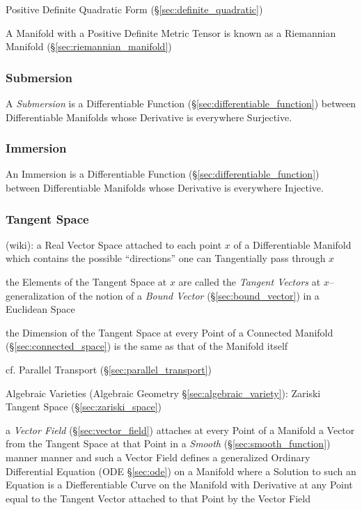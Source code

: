 Positive Definite Quadratic Form (\S\ref{sec:definite_quadratic})

A Manifold with a Positive Definite Metric Tensor is known as a
Riemannian Manifold (\S\ref{sec:riemannian_manifold})



\subsubsection{Submersion}\label{sec:submersion}

A \emph{Submersion} is a Differentiable Function
(\S\ref{sec:differentiable_function}) between Differentiable Manifolds
whose Derivative is everywhere Surjective.



\subsubsection{Immersion}\label{sec:immersion}

An Immersion is a Differentiable Function
(\S\ref{sec:differentiable_function}) between Differentiable Manifolds
whose Derivative is everywhere Injective.



\subsubsection{Tangent Space}\label{sec:tangent_space}

(wiki): a Real Vector Space attached to each point $x$ of a Differentiable
Manifold which contains the possible ``directions'' one can Tangentially pass
through $x$

the Elements of the Tangent Space at $x$ are called the \emph{Tangent Vectors}
at $x$-- generalization of the notion of a \emph{Bound Vector}
(\S\ref{sec:bound_vector}) in a Euclidean Space

the Dimension of the Tangent Space at every Point of a Connected Manifold
(\S\ref{sec:connected_space}) is the same as that of the Manifold itself

\fist cf. Parallel Transport (\S\ref{sec:parallel_transport})

\fist Algebraic Varieties (Algebraic Geometry \S\ref{sec:algebraic_variety}):
Zariski Tangent Space (\S\ref{sec:zariski_space})

a \emph{Vector Field} (\S\ref{sec:vector_field}) attaches at every Point of a
Manifold a Vector from the Tangent Space at that Point in a \emph{Smooth}
(\S\ref{sec:smooth_function}) manner manner and such a Vector Field defines a
generalized Ordinary Differential Equation (ODE \S\ref{sec:ode}) on a Manifold
where a Solution to such an Equation is a Diefferentiable Curve on the Manifold
with Derivative at any Point equal to the Tangent Vector attached to that Point
by the Vector Field



